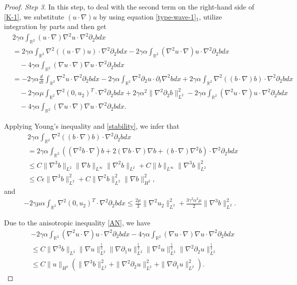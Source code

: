 \documentclass[reqno,11pt]{amsart}
\def\R{\mathbb R}
\numberwithin{Thm}{section}
\begin{document}
\begin{proof}
{\it {Step 3.}} In this step, to deal with the second term  on the right-hand side of \eqref{K-1}, we substitute $(u\cdot \nabla) u$ by using equation \eqref{type-wave-1}$_1$, utilize integration by parts and then get
\begin{align}\label{Part III}
&2\gamma\alpha\int_{\R^2}(u\cdot\nabla)\nabla^2 u\cdot\nabla^2\partial_2 bdx\nonumber\\
&=2\gamma\alpha\int_{\R^2}\nabla^2 ((u\cdot\nabla)u)\cdot\nabla^2\partial_2 bdx-2\gamma\alpha\int_{\R^2}(\nabla^2 u\cdot\nabla)u\cdot\nabla^2\partial_2 bdx\nonumber\\
&\quad-4\gamma\alpha\int_{\R^2}(\nabla u\cdot\nabla)\nabla u\cdot\nabla^2\partial_2 bdx\nonumber\\
&=-2\gamma\alpha\frac{d}{dt}\int_{\R^2}\nabla^2 u\cdot\nabla^2\partial_2 bdx-2\gamma\alpha\int_{\R^2}\nabla^2\partial_2u\cdot\partial_t\nabla^2 bdx+2\gamma\alpha\int_{\R^2}\nabla^2((b\cdot\nabla )b)\cdot \nabla^2\partial_2 bdx\nonumber\\
&\quad-2\gamma\alpha\mu\int_{\R^2}\nabla^2(0,u_2)^{T}\cdot\nabla^2\partial_2 bdx+2\gamma\alpha^2\|\nabla^2 \partial_2b\|_{L^2}^2-2\gamma\alpha\int_{\R^2}(\nabla^2 u\cdot\nabla)u\cdot\nabla^2\partial_2 bdx\nonumber\\
&\quad-4\gamma\alpha\int_{\R^2}(\nabla u\cdot\nabla)\nabla u\cdot\nabla^2\partial_2 bdx.
\end{align}


Applying Young's inequality and \eqref{stability}, we infer that
\begin{align}\label{Part III1}
&2\gamma\alpha\int_{\R^2}\nabla^2((b\cdot\nabla )b)\cdot\nabla^2\partial_2 bdx\nonumber\\&
=2\gamma\alpha\int_{\R^2}((\nabla^2 b\cdot\nabla) b+2(\nabla b\cdot\nabla)\nabla b+( b\cdot\nabla)\nabla^2 b)\cdot\nabla^2\partial_2 bdx\nonumber\\
&\leq C\|\nabla^3 b\|_{L^2}\|\nabla b\|_{L^{\infty}}\|\nabla^2 b\|_{L^2}+C\|b\|_{L^{\infty}}\|\nabla^3 b\|_{L^{2}}^2\nonumber\\&\leq C\epsilon\|\nabla^3 b\|_{L^{2}}^2+C\|\nabla^2 b\|_{L^{2}}^2\|\nabla b\|_{H^{2}}^2,
\end{align}
and
 \begin{align}\label{Part III3}
-2\gamma\mu\alpha\int_{\R^2}\nabla^2 (0,u_2)^{T}\cdot\nabla^2\partial_2 bdx
\leq \frac{2\mu}{3}\| \nabla^2 u_2\|_{L^2}^2+\frac{3\gamma^2\alpha^2\mu}{2}\|\nabla^3 b\|_{L^2}^2.
\end{align}


Due to  the anisotropic inequality \eqref{AN}, we have
\begin{align}\label{Part III2}
&-2\gamma\alpha\int_{\R^2}(\nabla^2 u\cdot\nabla)u\cdot\nabla^2\partial_2 bdx-4\gamma\alpha\int_{\R^2}(\nabla u\cdot\nabla)\nabla u\cdot\nabla^2\partial_2 bdx\nonumber\\
&\leq C\|\nabla^3 b\|_{L^2}\|\nabla u\|_{L^2}^{\frac{1}{2}}\|\nabla\partial_1 u\|_{L^2}^{\frac{1}{2}}\|\nabla^2 u\|_{L^2}^{\frac{1}{2}}\|\nabla^2\partial_2 u\|_{L^2}^{\frac{1}{2}}\nonumber\\ &\leq C\|u\|_{H^{2}}(\|\nabla^3 b\|_{L^{2}}^2+\|\nabla^2\partial_2 u\|_{L^{2}}^2+\|\nabla\partial_1 u\|_{L^{2}}^2).
\end{align}


\end{proof}
\end{document}
